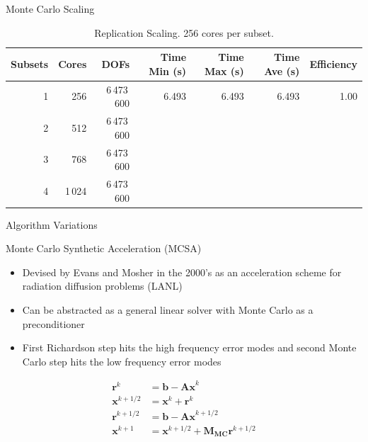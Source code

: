 \documentclass{beamer}
\begin{document}
\begin{frame}{Monte Carlo Scaling}
  \vspace{-0.2in}

  \begin{table}[htb!]
    \tiny
    \begin{center}
      \begin{tabular}{rrrrrrr}
        \toprule
        \multicolumn{1}{r}{Subsets} &
        \multicolumn{1}{r}{Cores} &
        \multicolumn{1}{r}{DOFs} &
        \multicolumn{1}{r}{Time Min (s)} &
        \multicolumn{1}{r}{Time Max (s)} &
        \multicolumn{1}{r}{Time Ave (s)} &
        \multicolumn{1}{r}{Efficiency}
        \\ \midrule
        1 & 256 & 6\,473\,600 & 6.493 & 6.493 & 6.493 & 1.00 \\
        2 & 512 & 6\,473\,600 &  &  & & \\
        3 & 768 & 6\,473\,600 &  &  & & \\
        4 & 1\,024 & 6\,473\,600 & &  & & \\
        \bottomrule
      \end{tabular}
    \end{center}
    \vspace{-0.09in}
    \caption{\small Replication Scaling. 256 cores per subset.}
  \end{table} 

\end{frame}

\begin{frame}

  \center Algorithm Variations
  
\end{frame}

\begin{frame}{Monte Carlo Synthetic Acceleration (MCSA)}
  \begin{itemize}
  \item Devised by Evans and Mosher in the 2000's as an acceleration
    scheme for radiation diffusion problems (LANL)
    \vfill
  \item Can be abstracted as a general linear solver with Monte Carlo as a
    preconditioner
    \vfill
  \item First Richardson step hits the high frequency error modes and second
    Monte Carlo step hits the low frequency error modes
  \end{itemize}
  \vfill
  \begin{align*}
    \mathbf{r}^k &= \mathbf{b} - \mathbf{Ax}^k \\
    \mathbf{x}^{k+1/2} &= \mathbf{x}^k + \mathbf{r}^k \\
    \mathbf{r}^{k+1/2} &= \mathbf{b} - \mathbf{Ax}^{k+1/2} \\
    \mathbf{x}^{k+1} &= \mathbf{x}^{k+1/2} + \mathbf{M_{MC}} \mathbf{r}^{k+1/2}
  \end{align*}
\end{frame}
\end{document}
